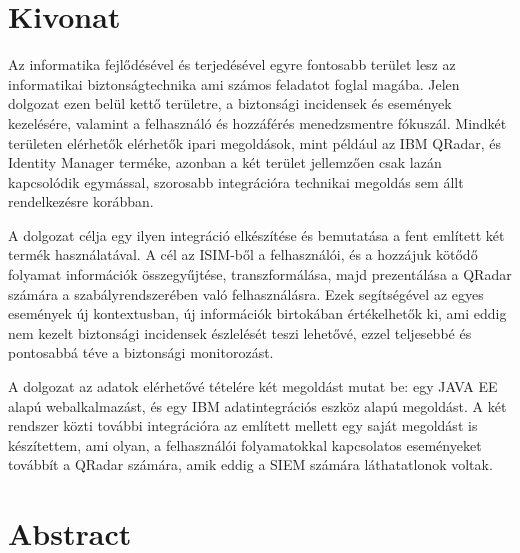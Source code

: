 \setcounter{page}{1}

\selecthungarian

\chapter*{Kivonat}

Az informatika fejlődésével és terjedésével egyre fontosabb terület lesz az informatikai biztonságtechnika ami számos feladatot foglal magába. Jelen dolgozat ezen belül kettő területre, a biztonsági incidensek és események kezelésére, valamint a felhasználó és hozzáférés menedzsmentre fókuszál. Mindkét területen elérhetők elérhetők ipari megoldások, mint például az IBM QRadar, és Identity Manager terméke, azonban a két terület jellemzően csak lazán kapcsolódik egymással, szorosabb integrációra technikai megoldás sem állt rendelkezésre korábban.

A dolgozat célja egy ilyen integráció elkészítése és bemutatása a fent említett két termék használatával. A cél az ISIM-ből a felhasználói, és a hozzájuk kötődő folyamat információk összegyűjtése, transzformálása, majd prezentálása a QRadar számára a szabályrendszerében való felhasználásra. Ezek segítségével az egyes események új kontextusban, új információk birtokában értékelhetők ki, ami eddig nem kezelt biztonsági incidensek észlelését teszi lehetővé, ezzel teljesebbé és pontosabbá téve a biztonsági monitorozást.


A dolgozat az adatok elérhetővé tételére két megoldást mutat be: egy JAVA EE alapú webalkalmazást, és egy IBM adatintegrációs eszköz alapú megoldást. A két rendszer közti további integrációra az említett mellett egy saját megoldást is készítettem, ami olyan, a felhasználói folyamatokkal kapcsolatos eseményeket továbbít a QRadar számára,  amik eddig a SIEM számára láthatatlonok voltak.


\vfill
\selectenglish


\chapter*{Abstract}

